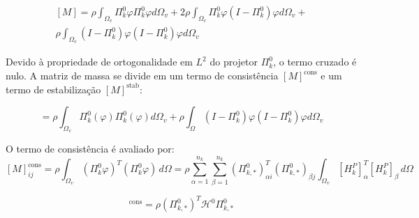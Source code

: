    \begin{equation}
        \begin{aligned} 
            [M]  = \rho \int_{\Omega_v}\Pi_k^0 \varphi \Pi_k^0 \varphi d\Omega_v +  2\rho \int_{\Omega_v}\Pi_k^0 \varphi  (I - \Pi_k^0) \varphi d\Omega_v + \\  \rho\int_{\Omega_v} (I - \Pi_k^0) \varphi  (I - \Pi_k^0) \varphi d\Omega_v 
        \end{aligned}
        \label{eq:4.56}
    \end{equation}

    \indent Devido à propriedade de ortogonalidade em $L^2$ do projetor $\Pi_k^0$, o termo cruzado é nulo. A matriz de massa se divide em um termo de consistência $[M]^{\text{cons}}$ e um termo de estabilização $[M]^{\text{stab}}$: 
    
    \begin{equation}
        [M] = \rho\int_{\Omega_v}\Pi_k^0(\varphi) \Pi_k^0(\varphi) d\Omega_v + \rho\int_{\Omega} (I - \Pi_k^0) \varphi (I - \Pi_k^0) \varphi d\Omega_v
        \label{eq:4.57}
    \end{equation}

    \indent O termo de consistência é avaliado por: $$[M]^{\text{cons}}_{ij} = \rho \int_{\Omega_v} (\Pi_k^0 \varphi)^T (\Pi_k^0 \varphi) \, d\Omega = \rho \sum_{\alpha=1}^{n_k} \sum_{\beta=1}^{n_k} (\Pi_{k,*}^0)_{\alpha i}^T (\Pi_{k,*}^0)_{\beta j} \int_{\Omega_v} [H_k^P]_\alpha^T [H_k^P]_\beta \, d\Omega$$
    
    \begin{equation}
        [M]^{\text{cons}} = \rho (\Pi_{k,*}^0)^T \mathcal{H}^0 \Pi_{k,*}^0 
        \label{eq:4.58}
    \end{equation}

